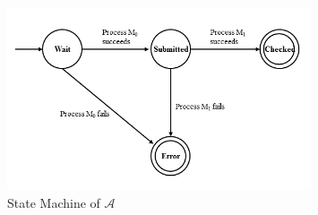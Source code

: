 \begin{figure}[h!]
\centering
\includegraphics[width=0.8\textwidth,natwidth=585,natheight=352]{figures/statemachinefigure.png}
\caption{State Machine of $\mathcal{A}$}
\end{figure}

